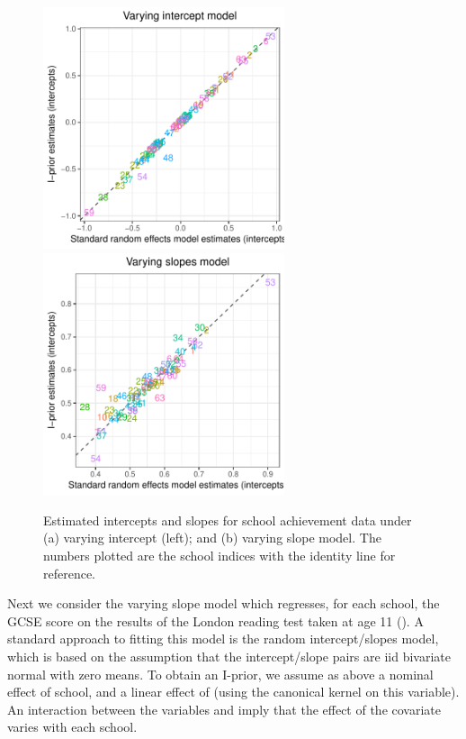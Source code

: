 \documentclass[a4paper,showframe,11pt]{report}\usepackage[]{graphicx}\usepackage[]{color}
\newenvironment{knitrout}{}{} %
\begin{document}
\begin{knitrout}
\color{fgcolor}\begin{figure}

{\centering \includegraphics[width=7.1cm,height=7.1cm]{figure/04_01_plot_em-1} 
\includegraphics[width=7.1cm,height=7.1cm]{figure/04_01_plot_em-2} 

}

\caption[Estimated intercepts and slopes for school achievement data under (a) varying intercept (left)]{Estimated intercepts and slopes for school achievement data under (a) varying intercept (left); and (b) varying slope model. The numbers plotted are the school indices with the identity line for reference.}\label{fig:04_01_plot_em}
\end{figure}


\end{knitrout}

Next we consider the varying slope model which regresses, for each school, the GCSE score on the results of the London reading test taken at age 11 (). A standard approach to fitting this model is the random intercept/slopes model, which is based on the assumption that the intercept/slope pairs are iid bivariate normal with zero means. To obtain an I-prior, we assume as above a nominal effect of school, and a linear effect of  (using the canonical kernel on this variable). An interaction between the variables  and  imply that the effect of the covariate  varies with each school.
\end{document}
